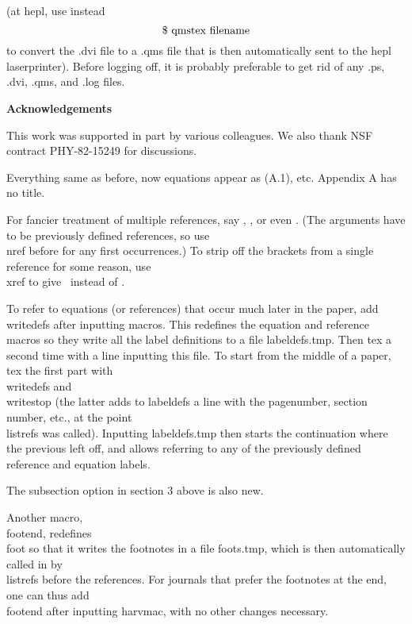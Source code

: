 
\subseclab\shepl %
(at hepl, use instead
%
$$\hbox{\$ qmstex filename}$$
%
to convert the .dvi file to a .qms file that is then automatically
sent to the hepl laserprinter).  Before logging off, it is
probably preferable to get rid of any .ps, .dvi, .qms, and .log files.


\bigbreak\bigskip\bigskip\centerline{{\bf Acknowledgements}}\nobreak
This work was supported in part by various colleagues.  We also thank
NSF contract PHY-82-15249 for discussions.


Everything same as before, now equations appear as (A.1), etc.
Appendix A has no title.


For fancier treatment of multiple references, say ,
, or even . (The arguments
have to be previously defined references, so use \\nref before for any
first occurrences.) To strip off the brackets from a single reference for
some reason, use \\xref to give \xref\rIi\ instead of \rIi.

To refer to equations (or references) that occur much later in the
paper, add \\writedefs after inputting macros.
This redefines the equation and reference macros so they write all the
label definitions to a file labeldefs.tmp. Then tex a second time with a
line inputting this file.  To start from the middle of a paper, tex
the first part with \\writedefs and \\writestop %
(the latter adds to labeldefs a line with the pagenumber, section number,
etc., at the point \\listrefs was called).  Inputting labeldefs.tmp then
starts the continuation where the previous left off, and allows referring
to any of the previously defined reference and equation labels.

The subsection option in section 3 above is also new.

Another macro, \\footend, redefines \\foot so that it writes the footnotes
in a file foots.tmp, which is then automatically called in by \\listrefs
before the references. For journals that prefer the footnotes at the
end, one can thus add \\footend after inputting harvmac,
with no other changes necessary.

